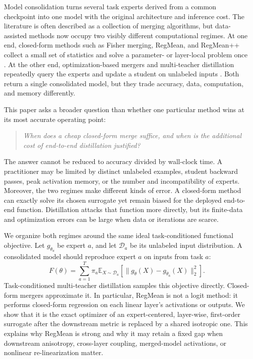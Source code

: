 \documentclass[letterpaper]{article} %
\theoremstyle{plain}
\theoremstyle{definition}
\begin{document}
Model consolidation turns several task experts derived from a common checkpoint into one model with the original architecture and inference cost.
The literature is often described as a collection of merging algorithms, but data-assisted methods now occupy two visibly different computational regimes.
At one end, closed-form methods such as Fisher merging, RegMean, and RegMean++ collect a small set of statistics and solve a parameter- or layer-local problem once \citep{matena2022fisher,jin2023regmean,regmeanplusplus2025}.
At the other end, optimization-based mergers and multi-teacher distillation repeatedly query the experts and update a student on unlabeled inputs \citep{yang2024adamerging,prodistill2025,samerging2025}.
Both return a single consolidated model, but they trade accuracy, data, computation, and memory differently.

This paper asks a broader question than whether one particular method wins at its most accurate operating point:
\begin{quote}
\emph{When does a cheap closed-form merge suffice, and when is the additional cost of end-to-end distillation justified?}
\end{quote}
The answer cannot be reduced to accuracy divided by wall-clock time.
A practitioner may be limited by distinct unlabeled examples, student backward passes, peak activation memory, or the number and incompatibility of experts.
Moreover, the two regimes make different kinds of error.
A closed-form method can exactly solve its chosen surrogate yet remain biased for the deployed end-to-end function.
Distillation attacks that function more directly, but its finite-data and optimization errors can be large when data or iterations are scarce.

We organize both regimes around the same ideal task-conditioned functional objective.
Let $g_{\theta_a}$ be expert $a$, and let $\mathcal D_a$ be its unlabeled input distribution.
A consolidated model should reproduce expert $a$ on inputs from task $a$:
\begin{equation}
F(\theta)=\sum_{a=1}^{T}\pi_a
\mathbb E_{X\sim\mathcal D_a}
\left[\|g_\theta(X)-g_{\theta_a}(X)\|_2^2\right].
\label{eq:functional-objective}
\end{equation}
Task-conditioned multi-teacher distillation samples this objective directly.
Closed-form mergers approximate it.
In particular, RegMean is not a logit method: it performs closed-form regression on each linear layer's activations or outputs.
We show that it is the exact optimizer of an expert-centered, layer-wise, first-order surrogate after the downstream metric is replaced by a shared isotropic one.
This explains why RegMean is strong and why it may retain a fixed gap when downstream anisotropy, cross-layer coupling, merged-model activations, or nonlinear re-linearization matter.
\end{document}

